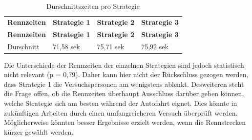 \documentclass[12pt,a4paper]{scrartcl}
\begin{document}
\begin{longtable}{p{3cm}p{3cm}p{3cm}p{3cm} }
	\label{RennZeitenDis1}\\
	\caption[Durschnittszeiten pro Strategie]{Durschnittszeiten pro Strategie}\\
	\hline
	\textbf{Rennzeiten}&\textbf{Strategie 1}&\textbf{Strategie 2} &\textbf{Strategie 3}\\
	\hline
	\endfirsthead
	\hline
	\textbf{Rennzeiten}&\textbf{Strategie 1}&\textbf{Strategie 2} &\textbf{Strategie 3}\\
	\hline
	\endhead
Durschnitt & 71,58 sek & 75,71 sek & 75,92 sek\\
\hline
\end{longtable}
Die Unterschiede der Rennzeiten der einzelnen Strategien sind jedoch statistisch nicht relevant (p = 0,79). Daher kann hier nicht der Rückschluss gezogen werden, dass Strategie 1 die Versuchspersonen am wenigstens ablenkt. Desweiteren steht die Frage offen, ob die Rennzeiten überhaupt Ausschluss darüber geben können, welche Strategie sich am besten während der Autofahrt eignet. Dies könnte in zukünftigen Arbeiten durch einen umfangreicheren Versuch überprüft werden. Möglicherweise könnten besser Ergebnisse erzielt werden, wenn die Rennstrecken kürzer gewählt werden.  
\end{document}
